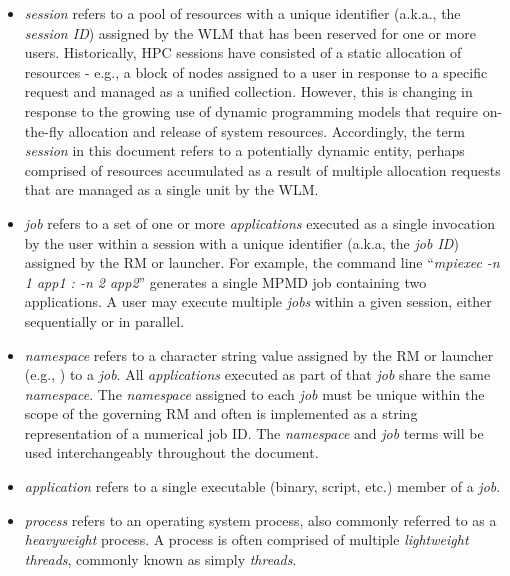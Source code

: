\begin{itemize}
\item {}\emph{session} refers to a pool of resources with a unique identifier (a.k.a., the \emph{session ID}) assigned by the \ac{WLM} that has been reserved for one or more users. Historically, \ac{HPC} sessions have consisted of a static allocation of resources - e.g., a block of nodes assigned to a user in response to a specific request and managed as a unified collection. However, this is changing in response to the growing use of dynamic programming models that require on-the-fly allocation and release of system resources. Accordingly, the term \emph{session} in this document refers to a potentially dynamic entity, perhaps comprised of resources accumulated as a result of multiple allocation requests that are managed as a single unit by the \ac{WLM}.

\item {}\emph{job} refers to a set of one or more \emph{applications} executed as a single invocation by the user within a session with a unique identifier (a.k.a, the \emph{job ID}) assigned by the \ac{RM} or launcher. For example, the command line ``\textit{mpiexec -n 1 app1 : -n 2 app2}'' generates a single \ac{MPMD} job containing two applications. A user may execute multiple \emph{jobs} within a given session, either sequentially or in parallel.

\item {}\emph{namespace} refers to a character string value assigned by the \ac{RM} or launcher (e.g., ) to a \textit{job}. All \textit{applications} executed as part of that \textit{job} share the same \emph{namespace}. The \emph{namespace} assigned to each \emph{job} must be unique within the scope of the governing \ac{RM} and often is implemented as a string representation of a numerical job ID. The \emph{namespace} and \emph{job} terms will be used interchangeably throughout the document.

\item {}\emph{application} refers to a single executable (binary, script, etc.) member of a \emph{job}.

\item {}\emph{process} refers to an operating system process, also commonly referred to as a \emph{heavyweight} process. A process is often comprised of multiple \emph{lightweight threads}, commonly known as simply \emph{threads}.


\end{itemize}
